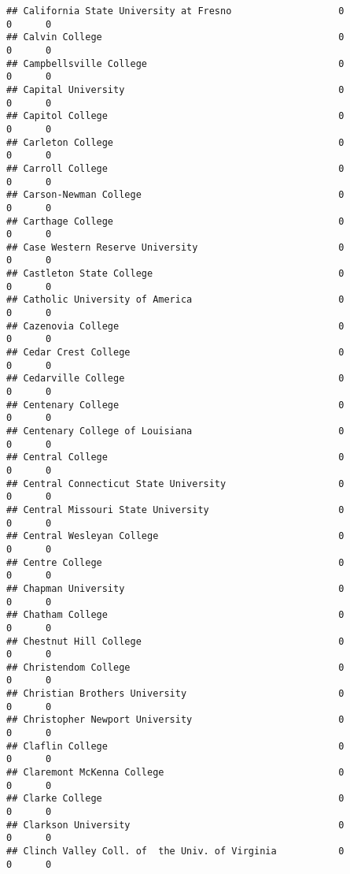 \documentclass[
]{article}
\begin{document}
\begin{verbatim}
## California State University at Fresno                   0          0      0
## Calvin College                                          0          0      0
## Campbellsville College                                  0          0      0
## Capital University                                      0          0      0
## Capitol College                                         0          0      0
## Carleton College                                        0          0      0
## Carroll College                                         0          0      0
## Carson-Newman College                                   0          0      0
## Carthage College                                        0          0      0
## Case Western Reserve University                         0          0      0
## Castleton State College                                 0          0      0
## Catholic University of America                          0          0      0
## Cazenovia College                                       0          0      0
## Cedar Crest College                                     0          0      0
## Cedarville College                                      0          0      0
## Centenary College                                       0          0      0
## Centenary College of Louisiana                          0          0      0
## Central College                                         0          0      0
## Central Connecticut State University                    0          0      0
## Central Missouri State University                       0          0      0
## Central Wesleyan College                                0          0      0
## Centre College                                          0          0      0
## Chapman University                                      0          0      0
## Chatham College                                         0          0      0
## Chestnut Hill College                                   0          0      0
## Christendom College                                     0          0      0
## Christian Brothers University                           0          0      0
## Christopher Newport University                          0          0      0
## Claflin College                                         0          0      0
## Claremont McKenna College                               0          0      0
## Clarke College                                          0          0      0
## Clarkson University                                     0          0      0
## Clinch Valley Coll. of  the Univ. of Virginia           0          0      0

\end{verbatim}
\end{document}
